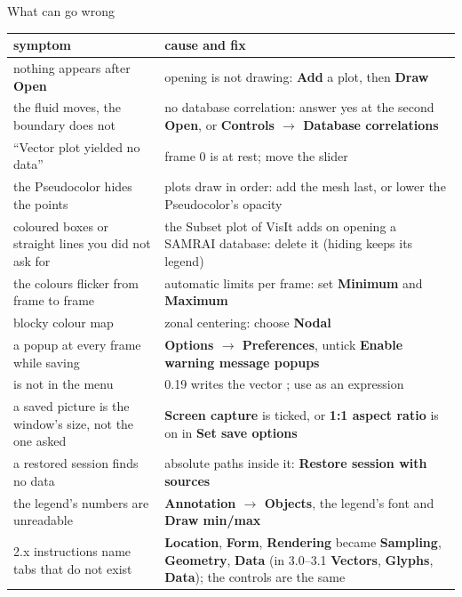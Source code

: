\documentclass[aspectratio=169,11pt]{beamer}
\newcommand{\gui}[1]{\textsf{\textbf{#1}}}
\begin{document}
\begin{frame}{What can go wrong}
\label{fr:wrong}
\scriptsize
\renewcommand{\arraystretch}{0.92}
\begin{tabular}{@{}L{0.36\textwidth}L{0.57\textwidth}@{}}
\toprule
symptom & cause and fix \\
\midrule
nothing appears after \gui{Open} & opening is not drawing: \gui{Add} a plot, then \gui{Draw} \\
the fluid moves, the boundary does not & no database correlation: answer yes at the second \gui{Open}, or \gui{Controls $\to$ Database correlations} \\
``Vector plot yielded no data'' & frame 0 is at rest; move the slider \\
the Pseudocolor hides the points & plots draw in order: add the mesh last, or lower the Pseudocolor's opacity \\
coloured boxes or straight lines you did not ask for & the Subset plot of  VisIt adds on opening a SAMRAI database: delete it (hiding keeps its legend) \\
the colours flicker from frame to frame & automatic limits per frame: set \gui{Minimum} and \gui{Maximum} \\
blocky colour map & zonal centering: choose \gui{Nodal} \\
a popup at every frame while saving & \gui{Options $\to$ Preferences}, untick \gui{Enable warning message popups} \\
 is not in the menu & 0.19 writes the vector ; use  as an expression \\
a saved picture is the window's size, not the one asked & \gui{Screen capture} is ticked, or \gui{1:1 aspect ratio} is on in \gui{Set save options} \\
a restored session finds no data & absolute paths inside it: \gui{Restore session with sources} \\
the legend's numbers are unreadable & \gui{Annotation $\to$ Objects}, the legend's font and \gui{Draw min/max} \\
2.x instructions name tabs that do not exist & \gui{Location}, \gui{Form}, \gui{Rendering} became \gui{Sampling}, \gui{Geometry}, \gui{Data} (in 3.0--3.1 \gui{Vectors}, \gui{Glyphs}, \gui{Data}); the controls are the same \\
\bottomrule
\end{tabular}
\end{frame}
\end{document}
